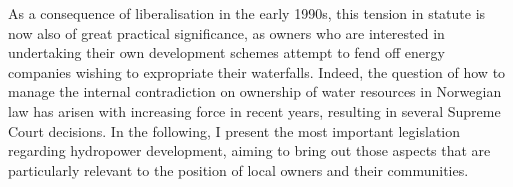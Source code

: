 As a consequence of liberalisation in the early 1990s, this tension in statute is now also of great practical significance, as owners who are interested in undertaking their own development schemes attempt to fend off energy companies wishing to expropriate their waterfalls. Indeed, the question of how to manage the internal contradiction on ownership of water resources in Norwegian law has arisen with increasing force in recent years, resulting in several Supreme Court decisions. In the following, I present the most important legislation regarding hydropower development, aiming to bring out those aspects that are particularly relevant to the position of local owners and their communities.





